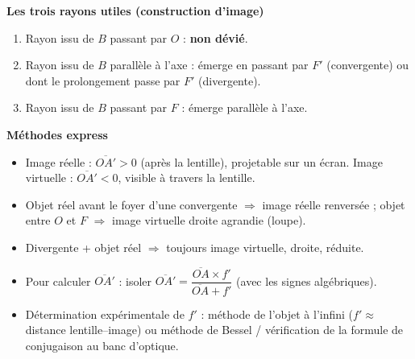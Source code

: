 \documentclass[11pt]{article}
\newcommand{\cle}[1]{{\popxbold\color{popdark}#1}}
\begin{document}
\begin{bilan}
\textbf{Les trois rayons utiles (construction d'image)}
\begin{enumerate}
  \item Rayon issu de $B$ passant par $O$ : \textbf{non dévié}.
  \item Rayon issu de $B$ parallèle à l'axe : émerge en passant par $F'$ (convergente) ou dont le prolongement passe par $F'$ (divergente).
  \item Rayon issu de $B$ passant par $F$ : émerge parallèle à l'axe.
\end{enumerate}

\textbf{Méthodes express}
\begin{itemize}
  \item \cle{Image réelle} : $\overline{OA'}>0$ (après la lentille), projetable sur un écran. \cle{Image virtuelle} : $\overline{OA'}<0$, visible à travers la lentille.
  \item Objet réel avant le foyer d'une convergente $\Rightarrow$ image réelle renversée ; objet entre $O$ et $F$ $\Rightarrow$ image virtuelle droite agrandie (loupe).
  \item Divergente + objet réel $\Rightarrow$ toujours image virtuelle, droite, réduite.
  \item Pour calculer $\overline{OA'}$ : isoler $\overline{OA'}=\dfrac{\overline{OA}\times f'}{\overline{OA}+f'}$ (avec les signes algébriques).
  \item Détermination expérimentale de $f'$ : méthode de l'objet à l'infini ($f'\approx$ distance lentille--image) ou méthode de Bessel / vérification de la formule de conjugaison au banc d'optique.
\end{itemize}
\end{bilan}
\end{document}
